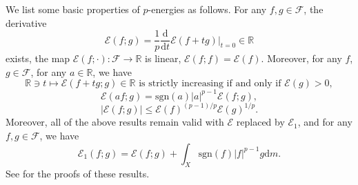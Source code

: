 \documentclass[11pt,a4paper]{article}
\numberwithin{equation}{section}
\theoremstyle{plain}
\theoremstyle{definition}
\begin{document}
We list some basic properties of $p$-energies as follows. For any $f,g\in\mathcal{F}$, the derivative
$$\mathcal{E}(f;g)=\frac{1}{p}\frac{\mathrm{d}}{\mathrm{d} t}\mathcal{E}(f+tg)|_{t=0}\in\mathbb{R}$$
exists, the map $\mathcal{E}(f;\cdot):\mathcal{F}\to\mathbb{R}$ is linear, $\mathcal{E}(f;f)=\mathcal{E}(f)$. Moreover, for any $f$, $g\in\mathcal{F}$, for any $a\in\mathbb{R}$, we have
\begin{equation}\label{eq_quasi_strict}
\mathbb{R}\ni t\mapsto\mathcal{E}(f+tg;g)\in\mathbb{R}\text{ is strictly increasing if and only if }\mathcal{E}(g)>0,
\end{equation}
$$\mathcal{E}(af;g)=\mathrm{sgn}(a)|a|^{p-1}\mathcal{E}(f;g),$$
$$|\mathcal{E}(f;g)|\le\mathcal{E}(f)^{(p-1)/p}\mathcal{E}(g)^{1/p}.$$
Moreover, all of the above results remain valid with $\mathcal{E}$ replaced by $\mathcal{E}_1$, and for any $f,g\in\mathcal{F}$, we have
$$\mathcal{E}_1(f;g)=\mathcal{E}(f;g)+\int_X\mathrm{sgn}(f)|f|^{p-1}g\mathrm{d} m.$$
See \cite[Theorem 3.7, Corollary 3.25]{KS24a} for the proofs of these results.
\end{document}
